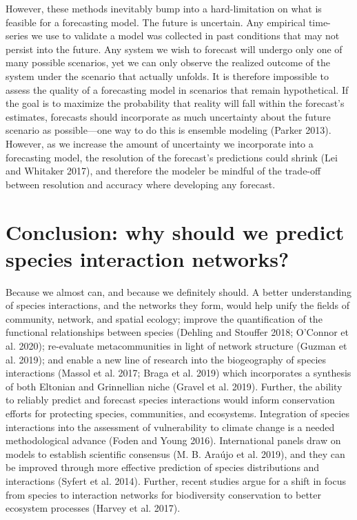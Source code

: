 \documentclass[11pt]{article}
\begin{document}
However, these methods inevitably bump into a hard-limitation on what is
feasible for a forecasting model. The future is uncertain. Any empirical
time-series we use to validate a model was collected in past conditions
that may not persist into the future. Any system we wish to forecast
will undergo only one of many possible scenarios, yet we can only
observe the realized outcome of the system under the scenario that
actually unfolds. It is therefore impossible to assess the quality of a
forecasting model in scenarios that remain hypothetical. If the goal is
to maximize the probability that reality will fall within the forecast's
estimates, forecasts should incorporate as much uncertainty about the
future scenario as possible---one way to do this is ensemble modeling
(Parker 2013). However, as we increase the amount of uncertainty we
incorporate into a forecasting model, the resolution of the forecast's
predictions could shrink (Lei and Whitaker 2017), and therefore the
modeler be mindful of the trade-off between resolution and accuracy
where developing any forecast.

\hypertarget{conclusion-why-should-we-predict-species-interaction-networks}{%
\section{Conclusion: why should we predict species interaction
networks?}\label{conclusion-why-should-we-predict-species-interaction-networks}}

Because we almost can, and because we definitely should. A better
understanding of species interactions, and the networks they form, would
help unify the fields of community, network, and spatial ecology;
improve the quantification of the functional relationships between
species (Dehling and Stouffer 2018; O'Connor et al. 2020); re-evaluate
metacommunities in light of network structure (Guzman et al. 2019); and
enable a new line of research into the biogeography of species
interactions (Massol et al. 2017; Braga et al. 2019) which incorporates
a synthesis of both Eltonian and Grinnellian niche (Gravel et al. 2019).
Further, the ability to reliably predict and forecast species
interactions would inform conservation efforts for protecting species,
communities, and ecosystems. Integration of species interactions into
the assessment of vulnerability to climate change is a needed
methodological advance (Foden and Young 2016). International panels draw
on models to establish scientific consensus (M. B. Araújo et al. 2019),
and they can be improved through more effective prediction of species
distributions and interactions (Syfert et al. 2014). Further, recent
studies argue for a shift in focus from species to interaction networks
for biodiversity conservation to better ecosystem processes (Harvey et
al. 2017).
\end{document}
